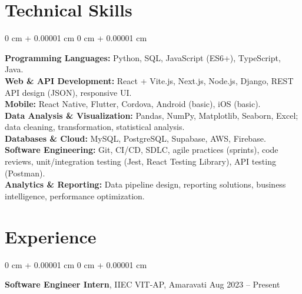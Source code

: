 \documentclass[10pt, letterpaper]{article}
\newenvironment{onecolentry}{ \begin{adjustwidth}{ 0 cm + 0.00001 cm }{ 0 cm + 0.00001 cm }
}{ \end{adjustwidth} } %
\newenvironment{twocolentry}[2][]{ \onecolentry \def\secondColumn{#2} \setcolumnwidth{\fill, 4.5 cm}
\begin{paracol}{2} }{ \switchcolumn \raggedleft \secondColumn \end{paracol}
\endonecolentry } %
\begin{document}
	\section{Technical Skills}

\begin{onecolentry}
			\textbf{Programming Languages:} Python, SQL, JavaScript (ES6+), TypeScript, Java.\\
	\vspace{0.10 cm}
					\textbf{Web \& API Development:} React + Vite.js, Next.js, Node.js, Django, REST API design (JSON), responsive UI. \\
	\vspace{0.10 cm}
							\textbf{Mobile:} React Native, Flutter, Cordova, Android (basic), iOS (basic).\\
	\vspace{0.10 cm}
			\textbf{Data Analysis \& Visualization:} Pandas, NumPy, Matplotlib, Seaborn, Excel; data cleaning, transformation, statistical analysis. \\
	\vspace{0.10 cm}
			\textbf{Databases \& Cloud:} MySQL, PostgreSQL, Supabase, AWS, Firebase. \\
	\vspace{0.10 cm}
					\textbf{Software Engineering:} Git, CI/CD, SDLC, agile practices (sprints), code reviews, unit/integration testing (Jest, React Testing Library), API testing (Postman).\\
	\vspace{0.10 cm}
			\textbf{Analytics \& Reporting:} Data pipeline design, reporting solutions, business intelligence, performance optimization. \\
\end{onecolentry}



	\section{Experience}

\begin{twocolentry}
	{ Aug 2023 – Present } \t\textbf{Software Engineer Intern}, IIEC VIT-AP, Amaravati
\end{twocolentry}
\end{document}
